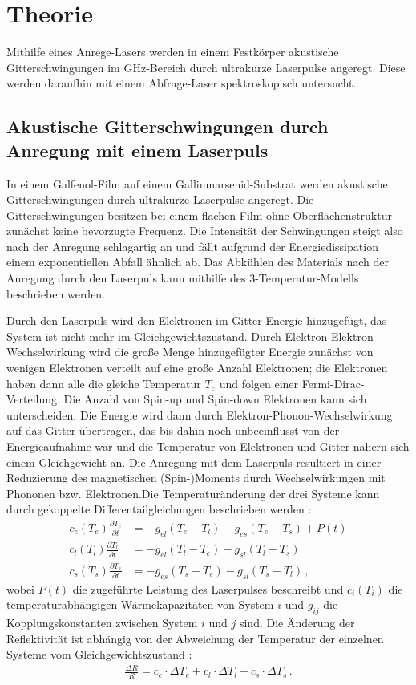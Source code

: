 \section{Theorie}

Mithilfe eines Anrege-Lasers werden in einem Festkörper akustische Gitterschwingungen im GHz-Bereich durch ultrakurze Laserpulse angeregt. Diese werden daraufhin mit einem Abfrage-Laser spektroskopisch untersucht.

\subsection{Akustische Gitterschwingungen durch Anregung mit einem Laserpuls}

In einem Galfenol-Film auf einem Galliumarsenid-Substrat werden akustische Gitterschwingungen durch ultrakurze Laserpulse angeregt. Die Gitterschwingungen besitzen bei einem flachen Film ohne Oberflächenstruktur zunächst keine bevorzugte Frequenz. Die Intensität der Schwingungen steigt also nach der Anregung schlagartig an und fällt aufgrund der Energiedissipation einem exponentiellen Abfall ähnlich ab. Das Abkühlen des Materials nach der Anregung durch den Laserpuls kann mithilfe des 3-Temperatur-Modells beschrieben werden.\par
Durch den Laserpuls wird den Elektronen im Gitter Energie hinzugefügt, das System ist nicht mehr im Gleichgewichtszustand. Durch Elektron-Elektron-Wechselwirkung wird die große Menge hinzugefügter Energie zunächst von wenigen Elektronen verteilt auf eine große Anzahl Elektronen; die Elektronen haben dann alle die gleiche Temperatur $T_e$ und folgen einer Fermi-Dirac-Verteilung. Die Anzahl von Spin-up und Spin-down Elektronen kann sich unterscheiden. Die Energie wird dann durch Elektron-Phonon-Wechselwirkung auf das Gitter übertragen, das bis dahin noch unbeeinflusst von der Energieaufnahme war und die Temperatur von Elektronen und Gitter nähern sich einem Gleichgewicht an. Die Anregung mit dem Laserpuls resultiert in einer Reduzierung des magnetischen (Spin-)Moments durch Wechselwirkungen mit Phononen bzw. Elektronen.Die Temperaturänderung der drei Systeme kann durch gekoppelte Differentailgleichungen beschrieben werden \cites{3TM-2, 3TM-1}:
\begin{align}
  c_e(T_e)\frac{\partial T_e}{\partial t} &= -g_{el} (T_e - T_l) - g_{es}(T_e - T_s) + P(t)\\
  c_l(T_l)\frac{\partial T_l}{\partial t} &= -g_{el} (T_l - T_e) - g_{sl}(T_l - T_s)\\
  c_s(T_s)\frac{\partial T_s}{\partial t} &= -g_{es} (T_s - T_e) - g_{sl}(T_s - T_l) \, ,
\end{align}
wobei $P(t)$ die zugeführte Leistung des Laserpulses beschreibt und $c_i(T_i)$ die temperaturabhängigen Wärmekapazitäten von System $i$ und $g_{ij}$ die Kopplungskonstanten zwischen System $i$ und $j$ sind. Die Änderung der Reflektivität ist abhängig von der Abweichung der Temperatur der einzelnen Systeme vom Gleichgewichtszustand \cite{3TM-2}:
\begin{align}
  \frac{\Delta R}{R} = c_e \cdot \Delta T_e + c_l \cdot \Delta T_l + c_s \cdot \Delta T_s \, .
\end{align}

